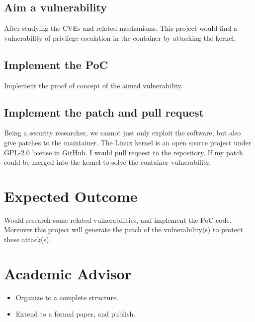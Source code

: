 \documentclass[12pt,a4paper,oneside]{IEEEconf}
\begin{document}
\subsection{Aim a vulnerability}
After studying the CVEs and related mechanisms. This project would find a vulnerability of privilege
escalation in the container by attacking the kernel.

\subsection{Implement the PoC}
Implement the proof of concept of the aimed vulnerability.

\subsection{Implement the patch and pull request}
Being a security researcher, we cannot just only exploit the software, but also give patches to
the maintainer. The Linux kernel is an open source project under GPL-2.0 license in GitHub.
I would pull request to the repository. If my patch could be merged into the kernel to solve the
container vulnerability.

\section{Expected Outcome}
Would research some related vulnerabilities, and implement the PoC code.
Moreover this project will generate the patch of the vulnerability(s) to protect these attack(s).

\printbibheading[heading=bibnumbered]
\printbibliography\newrefcontext

\section{Academic Advisor}
\begin{itemize}
  \item Organize to a complete structure.
  \item Extend to a formal paper, and publish.
\end{itemize}
\end{document}
